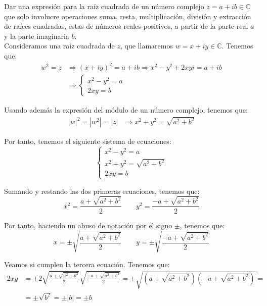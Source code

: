 \begin{ejercicio}
    Dar una expresión para la raíz cuadrada de un número complejo $z = a + ib\in \mathbb{C}$ que solo involucre operaciones suma, resta, multiplicación, división y extracción de raíces cuadradas, estas de números reales positivos, a partir de la parte real $a$ y la parte imaginaria $b$.\\

    Consideramos una raíz cuadrada de $z$, que llamaremos $w=x+iy\in \mathbb{C}$. Tenemos que:
    \begin{align*}
        w^2 = z &\Longrightarrow (x+iy)^2 = a + ib \Longrightarrow x^2 - y^2 + 2xyi = a + ib\\
        &\Longrightarrow \begin{cases}
            x^2 - y^2 = a \\
            2xy = b
        \end{cases}
    \end{align*}

    Usando además la expresión del módulo de un número complejo, tenemos que:
    \begin{align*}
        |w|^2 = |w^2| = |z| &\Longrightarrow x^2 + y^2 = \sqrt{a^2+b^2}
    \end{align*}

    Por tanto, tenemos el siguiente sistema de ecuaciones:
    \begin{equation*}
        \begin{cases}
            x^2 - y^2 = a \\
            x^2 + y^2 = \sqrt{a^2+b^2}\\
            2xy = b
        \end{cases}
    \end{equation*}

    Sumando y restando las dos primeras ecuaciones, tenemos que:
    \begin{equation*}
        x^2 = \frac{a + \sqrt{a^2+b^2}}{2}\qquad
        y^2 = \frac{-a + \sqrt{a^2+b^2}}{2}
    \end{equation*}

    Por tanto, haciendo un abuso de notación por el signo $\pm$, tenemos que:
    \begin{equation*}
        x = \pm \sqrt{\frac{a + \sqrt{a^2+b^2}}{2}}\qquad
        y = \pm \sqrt{\frac{-a + \sqrt{a^2+b^2}}{2}}
    \end{equation*}

    Veamos si cumplen la tercera ecuación. Tenemos que:
    \begin{align*}
        2xy &= \pm 2\sqrt{\frac{a + \sqrt{a^2+b^2}}{2}}\sqrt{\frac{-a + \sqrt{a^2+b^2}}{2}} = \pm \sqrt{(a + \sqrt{a^2+b^2})(-a + \sqrt{a^2+b^2})} =\\&= \pm \sqrt{b^2} = \pm |b| = \pm b
    \end{align*}


\end{ejercicio}
